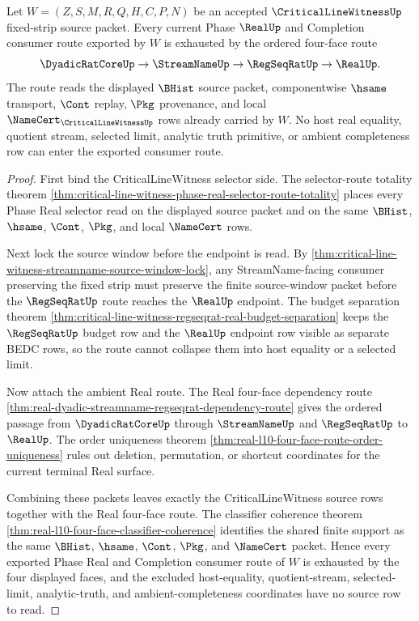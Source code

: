 \begin{theorem}
\label{thm:critical-line-witness-phase-real-four-face-route-exhaustion}
Let $W=(Z,S,M,R,Q,H,C,P,N)$ be an accepted $\CriticalLineWitnessUp$ fixed-strip source packet. Every current Phase $\RealUp$ and Completion consumer route exported by $W$ is exhausted by the ordered four-face route
$$
\DyadicRatCoreUp \to \StreamNameUp \to \RegSeqRatUp \to \RealUp .
$$
The route reads the displayed $\BHist$ source packet, componentwise $\hsame$ transport, $\Cont$ replay, $\Pkg$ provenance, and local $\NameCert_{\CriticalLineWitnessUp}$ rows already carried by $W$. No host real equality, quotient stream, selected limit, analytic truth primitive, or ambient completeness row can enter the exported consumer route.
\end{theorem}
\begin{proof}
First bind the CriticalLineWitness selector side. The selector-route totality theorem \autoref{thm:critical-line-witness-phase-real-selector-route-totality} places every Phase Real selector read on the displayed source packet and on the same $\BHist$, $\hsame$, $\Cont$, $\Pkg$, and local $\NameCert$ rows.

Next lock the source window before the endpoint is read. By \autoref{thm:critical-line-witness-streamname-source-window-lock}, any StreamName-facing consumer preserving the fixed strip must preserve the finite source-window packet before the $\RegSeqRatUp$ route reaches the $\RealUp$ endpoint. The budget separation theorem \autoref{thm:critical-line-witness-regseqrat-real-budget-separation} keeps the $\RegSeqRatUp$ budget row and the $\RealUp$ endpoint row visible as separate BEDC rows, so the route cannot collapse them into host equality or a selected limit.

Now attach the ambient Real route. The Real four-face dependency route \autoref{thm:real-dyadic-streamname-regseqrat-dependency-route} gives the ordered passage from $\DyadicRatCoreUp$ through $\StreamNameUp$ and $\RegSeqRatUp$ to $\RealUp$. The order uniqueness theorem \autoref{thm:real-l10-four-face-route-order-uniqueness} rules out deletion, permutation, or shortcut coordinates for the current terminal Real surface.

Combining these packets leaves exactly the CriticalLineWitness source rows together with the Real four-face route. The classifier coherence theorem \autoref{thm:real-l10-four-face-classifier-coherence} identifies the shared finite support as the same $\BHist$, $\hsame$, $\Cont$, $\Pkg$, and $\NameCert$ packet. Hence every exported Phase Real and Completion consumer route of $W$ is exhausted by the four displayed faces, and the excluded host-equality, quotient-stream, selected-limit, analytic-truth, and ambient-completeness coordinates have no source row to read.
\end{proof}

